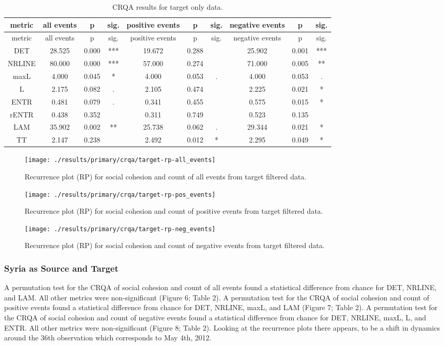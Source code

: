 \documentclass[english,man]{apa6}
\begin{document}
\begin{longtable}[]{@{}cccccccccc@{}}
\caption{CRQA results for target only data.}\tabularnewline
\toprule
metric & all events & p & sig. & positive events & p & sig. & negative events & p & sig.\tabularnewline
\midrule
\endfirsthead
\toprule
metric & all events & p & sig. & positive events & p & sig. & negative events & p & sig.\tabularnewline
\midrule
\endhead
DET & 28.525 & 0.000 & *** & 19.672 & 0.288 & & 25.902 & 0.001 & ***\tabularnewline
NRLINE & 80.000 & 0.000 & *** & 57.000 & 0.274 & & 71.000 & 0.005 & **\tabularnewline
maxL & 4.000 & 0.045 & * & 4.000 & 0.053 & . & 4.000 & 0.053 & .\tabularnewline
L & 2.175 & 0.082 & . & 2.105 & 0.474 & & 2.225 & 0.021 & *\tabularnewline
ENTR & 0.481 & 0.079 & . & 0.341 & 0.455 & & 0.575 & 0.015 & *\tabularnewline
rENTR & 0.438 & 0.352 & & 0.311 & 0.749 & & 0.523 & 0.135 &\tabularnewline
LAM & 35.902 & 0.002 & ** & 25.738 & 0.062 & . & 29.344 & 0.021 & *\tabularnewline
TT & 2.147 & 0.238 & & 2.492 & 0.012 & * & 2.295 & 0.049 & *\tabularnewline
\bottomrule
\end{longtable}

\begin{figure}
\texttt{[image: ./results/primary/crqa/target-rp-all\_events]} \caption{Recurrence plot (RP) for social cohesion and count of all events from target filtered data.}\label{fig:plot-rp-targ-all}
\end{figure}

\begin{figure}
\texttt{[image: ./results/primary/crqa/target-rp-pos\_events]} \caption{Recurrence plot (RP) for social cohesion and count of positive events from target filtered data.}\label{fig:plot-rp-targ-pos}
\end{figure}

\begin{figure}
\texttt{[image: ./results/primary/crqa/target-rp-neg\_events]} \caption{Recurrence plot (RP) for social cohesion and count of negative events from target filtered data.}\label{fig:plot-rp-targ-neg}
\end{figure}

\hypertarget{syria-as-source-and-target}{%
\subsubsection{Syria as Source and Target}\label{syria-as-source-and-target}}

A permutation test for the CRQA of social cohesion and count of all events found a statistical difference from chance for DET, NRLINE, and LAM. All other metrics were non-significant (Figure 6; Table 2). A permutation test for the CRQA of social cohesion and count of positive events found a statistical difference from chance for DET, NRLINE, maxL, and LAM (Figure 7; Table 2). A permutation test for the CRQA of social cohesion and count of negative events found a statistical difference from chance for DET, NRLINE, maxL, L, and ENTR. All other metrics were non-significant (Figure 8; Table 2). Looking at the recurrence plots there appears, to be a shift in dynamics around the 36th observation which corresponds to May 4th, 2012.
\end{document}
